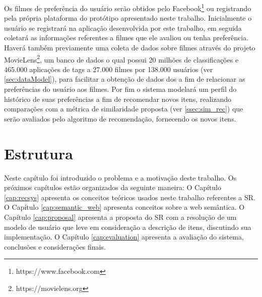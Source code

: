 Os filmes de preferência do usuário serão obtidos pelo Facebook\footnote{https://www.facebook.com} ou registrando pela própria plataforma do protótipo apresentado neste trabalho. Inicialmente o usuário se registrará na aplicação desenvolvida por este trabalho, em seguida coletará as informações referentes a filmes que ele avaliou ou tenha preferência. Haverá também previamente uma coleta de dados sobre filmes através do projeto MovieLens\footnote{https://movielens.org}, um banco de dados o qual possui 20 milhões de classificações e 465.000 aplicações de tags a 27.000 filmes por 138.000 usuários (ver \ref{sec:dataModel}), para facilitar a obtenção de dados dos a fim de relacionar as preferências do usuário aos filmes. Por fim o sistema modelará um perfil do histórico de suas preferências a fim de recomendar novos itens, realizando comparações com a métrica de similaridade proposta (ver \ref{ssec:sim_rec}) que serão avaliados pelo algoritmo de recomendação, fornecendo os novos itens.

\section{Estrutura}
Neste capítulo foi introduzido o problema e a motivação deste trabalho. Os próximos capítulos estão organizados da seguinte maneira: O Capítulo \ref{cap:recsys} apresenta os conceitos teóricos usados neste trabalho referentes a SR. O Capítulo \ref{cap:semantic_web} apresenta conceitos sobre a web semântica. O Capítulo \ref{cap:proposal} apresenta a proposta do SR com a resolução de um modelo de usuário que leve em consideração a descrição de itens, discutindo sua implementação. O Capítulo \ref{cap:evaluation} apresenta a avaliação do sistema, conclusões e considerações finais.